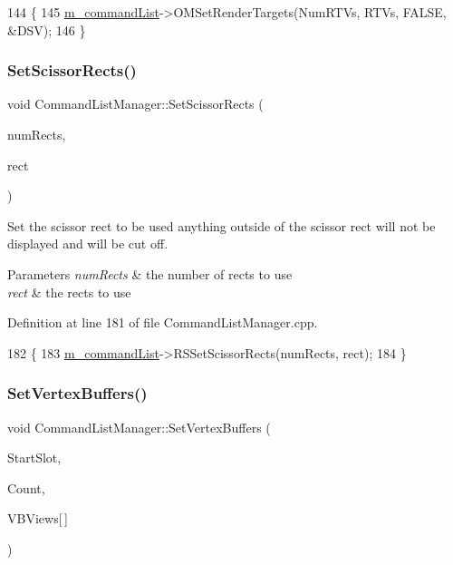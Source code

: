 \begin{DoxyCode}
144 \{
145     \mbox{\hyperlink{class_command_list_manager_a1366f0acddca408167ffcab59be71ddb}{m\_commandList}}->OMSetRenderTargets(NumRTVs, RTVs, FALSE, &DSV);
146 \}
\end{DoxyCode}
\mbox{\label{class_command_list_manager_ad3a754f13f381b10112abea8cb21e18a}} 
\subsubsection{\texorpdfstring{Set\+Scissor\+Rects()}{SetScissorRects()}}
{\footnotesize\ttfamily void Command\+List\+Manager\+::\+Set\+Scissor\+Rects (\begin{DoxyParamCaption}\item[{int}]{num\+Rects,  }\item[{D3\+D12\+\_\+\+R\+E\+CT $\ast$}]{rect }\end{DoxyParamCaption})}



Set the scissor rect to be used anything outside of the scissor rect will not be displayed and will be cut off. 


\begin{DoxyParams}{Parameters}
{\em num\+Rects} & the number of rects to use \\
\hline
{\em rect} & the rects to use \\
\hline
\end{DoxyParams}


Definition at line 181 of file Command\+List\+Manager.\+cpp.


\begin{DoxyCode}
182 \{
183     \mbox{\hyperlink{class_command_list_manager_a1366f0acddca408167ffcab59be71ddb}{m\_commandList}}->RSSetScissorRects(numRects, rect);
184 \}
\end{DoxyCode}
\mbox{\label{class_command_list_manager_a106aff91e2a78da34b7e90243b289cd6}} 
\subsubsection{\texorpdfstring{Set\+Vertex\+Buffers()}{SetVertexBuffers()}}
{\footnotesize\ttfamily void Command\+List\+Manager\+::\+Set\+Vertex\+Buffers (\begin{DoxyParamCaption}\item[{U\+I\+NT}]{Start\+Slot,  }\item[{U\+I\+NT}]{Count,  }\item[{const D3\+D12\+\_\+\+V\+E\+R\+T\+E\+X\+\_\+\+B\+U\+F\+F\+E\+R\+\_\+\+V\+I\+EW}]{V\+B\+Views\mbox{[}$\,$\mbox{]} }\end{DoxyParamCaption})}



